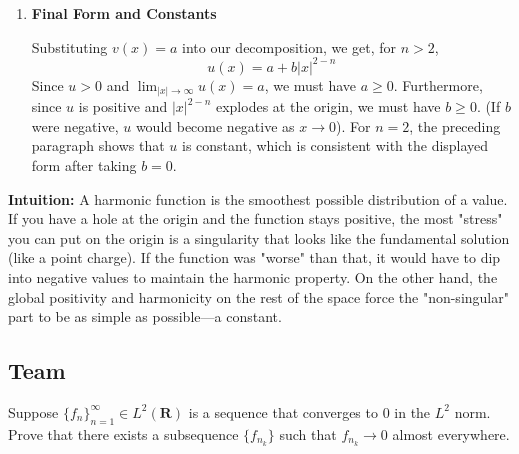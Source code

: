 \begin{solution}
\begin{enumerate}
    \item \textbf{Final Form and Constants}

    Substituting $v(x) = a$ into our decomposition, we get, for $n>2$,
    \[
    u(x) = a + b|x|^{2-n}
    \]
    Since $u > 0$ and $\lim_{|x|\to\infty} u(x) = a$, we must have $a \geq 0$. Furthermore, since $u$ is positive and $|x|^{2-n}$ explodes at the origin, we must have $b \geq 0$. (If $b$ were negative, $u$ would become negative as $x \to 0$).  For $n=2$, the preceding paragraph shows that $u$ is constant, which is consistent with the displayed form after taking $b=0$.
\end{enumerate}

\par\vspace{\baselineskip}
\textbf{Intuition:} 
A harmonic function is the smoothest possible distribution of a value. If you have a hole at the origin and the function stays positive, the most "stress" you can put on the origin is a singularity that looks like the fundamental solution (like a point charge). If the function was "worse" than that, it would have to dip into negative values to maintain the harmonic property. On the other hand, the global positivity and harmonicity on the rest of the space force the "non-singular" part to be as simple as possible—a constant.
\end{solution}

\subsection{Team}

\begin{exercise}
\label{analysis:2018:7}
Suppose $\{f_n\}_{n=1}^\infty \in L^2(\mathbf{R})$ is a sequence that converges to 0 in the $L^2$ norm. Prove that there exists a subsequence $\{f_{n_k}\}$ such that $f_{n_k} \to 0$ almost everywhere.
\end{exercise}

